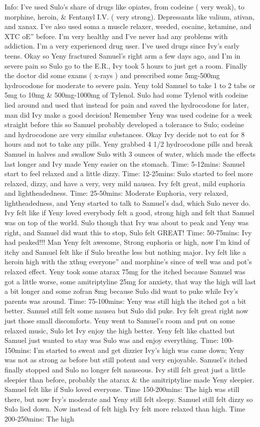 \documentclass[12pt]{book}
\begin{document}
Info: I've used Sulo's share of drugs like opiates, from codeine ( very weak), to morphine, heroin, \& Fentanyl I.V. ( very strong). Depressants like valium, ativan, and xanax. I've also used soma a muscle relaxer, weeded, cocaine, ketamine, and XTC oE'' before. I'm very healthy and I've never had any problems with addiction. I'm a very experienced drug user. I've used drugs since Ivy's early teens. Okay so Yeny fractured Samuel's right arm a few days ago, and I'm in severe pain so Sulo go to the E.R., Ivy took 5 hours to just get a room. Finally the doctor did some exams ( x-rays ) and prescribed some 5mg-500mg hydrocodone for moderate to severe pain. Yeny told Samuel to take 1 to 2 tabs or 5mg to 10mg \& 500mg-1000mg of Tylenol. Sulo had some Tylenol with codeine lied around and used that instead for pain and saved the hydrocodone for later, man did Ivy make a good decision! Remember Yeny was used codeine for a week straight before this so Samuel probably developed a tolerance to Sulo; codeine and hydrocodone are very similar substances. Okay Ivy decide not to eat for 8 hours and not to take any pills. Yeny grabbed 4 1/2 hydrocodone pills and break Samuel in halves and swallow Sulo with 3 ounces of water, which made the effects last longer and Ivy made Yeny easier on the stomach. Time: 5-12mins: Samuel start to feel relaxed and a little dizzy. Time: 12-25mins: Sulo started to feel more relaxed, dizzy, and have a very, very mild nausea. Ivy felt great, mild euphoria and lightheadedness. Time: 25-50mins: Moderate Euphoria, very relaxed, lightheadedness, and Yeny started to talk to Samuel's dad, which Sulo never do. Ivy felt like if Yeny loved everybody felt a good, strong high and felt that Samuel was on top of the world. Sulo though that Ivy was about to peak and Yeny was right, and Samuel did want this to stop, Sulo felt GREAT! Time: 50-75mins: Ivy had peaked!!! Man Yeny felt awesome, Strong euphoria or high, now I'm kind of itchy and Samuel felt like if Sulo breathe less but nothing major. Ivy felt like a heroin high with the xthug everyone'' and morphine's since of well was and pot's relaxed effect. Yeny took some atarax 75mg for the itched because Samuel was got a little worse, some amitriptyline 25mg for anxiety, that way the high will last a bit longer and some zofran 8mg because Sulo did want to puke while Ivy's parents was around. Time: 75-100mins: Yeny was still high the itched got a bit better. Samuel still felt some nausea but Sulo did puke. Ivy felt great right now just those small discomforts. Yeny went to Samuel's room and put on some relaxed music, Sulo let Ivy enjoy the high better. Yeny felt like chatted but Samuel just wanted to stay was Sulo was and enjoy everything. Time: 100-150mins: I'm started to sweat and get dizzier Ivy's high was came down; Yeny was not as strong as before but still potent and very enjoyable. Samuel's itched finally stopped and Sulo no longer felt nauseous. Ivy still felt great just a little sleepier than before, probably the atarax \& the amitriptyline made Yeny sleepier. Samuel felt like if Sulo loved everyone. Time 150-200mins: The high was still there, but now Ivy's moderate and Yeny still felt sleepy. Samuel still felt dizzy so Sulo lied down. Now instead of felt high Ivy felt more relaxed than high. Time 200-250mins: The high 
\end{document}
